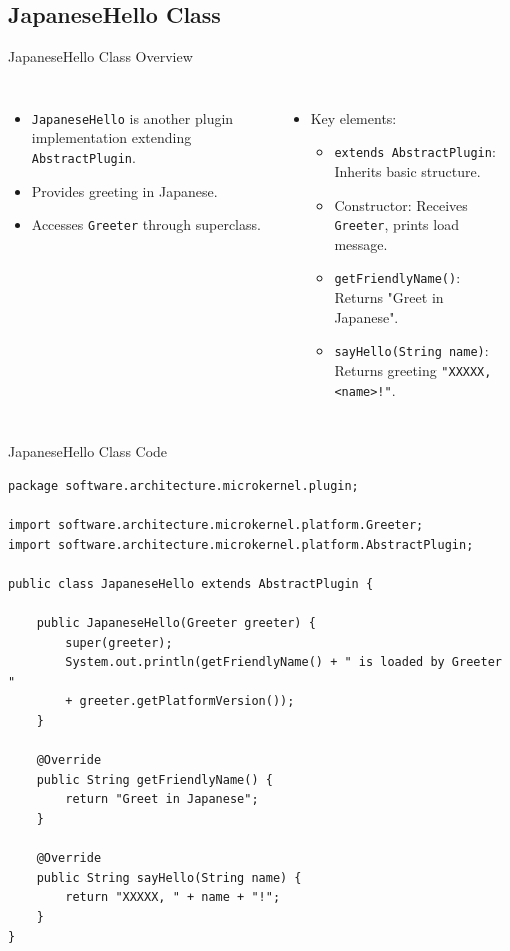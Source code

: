 \documentclass[aspectratio=169, table]{beamer}
\begin{document}
\subsection{JapaneseHello Class}

\begin{frame}{JapaneseHello Class Overview}
\vspace{20pt}
\begin{columns}[t]
\begin{itemize}
	\item \texttt{JapaneseHello} is another plugin implementation extending \texttt{AbstractPlugin}.
	\item Provides greeting in Japanese.
	\item Accesses \texttt{Greeter} through superclass.
\end{itemize}
\begin{itemize}
	\item Key elements:
	\begin{itemize}
		\item \texttt{extends AbstractPlugin}: Inherits basic structure.
		\item Constructor: Receives \texttt{Greeter}, prints load message.
		\item \texttt{getFriendlyName()}: Returns "Greet in Japanese".
		\item \texttt{sayHello(String name)}: Returns greeting \texttt{"XXXXX, <name>!"}.
	\end{itemize}
\end{itemize}
\end{columns}
\end{frame}

\begin{frame}[fragile]{JapaneseHello Class Code}
\vspace{20pt}
\begin{lstlisting}[style=JavaStyle, inputencoding=utf8, basicstyle=\tiny\ttfamily]
package software.architecture.microkernel.plugin;

import software.architecture.microkernel.platform.Greeter;
import software.architecture.microkernel.platform.AbstractPlugin;

public class JapaneseHello extends AbstractPlugin {
	
	public JapaneseHello(Greeter greeter) {
		super(greeter);
		System.out.println(getFriendlyName() + " is loaded by Greeter "
		+ greeter.getPlatformVersion());
	}
	
	@Override
	public String getFriendlyName() {
		return "Greet in Japanese";
	}
	
	@Override
	public String sayHello(String name) {
		return "XXXXX, " + name + "!";
	}
}
\end{lstlisting}
\end{frame}
\end{document}
